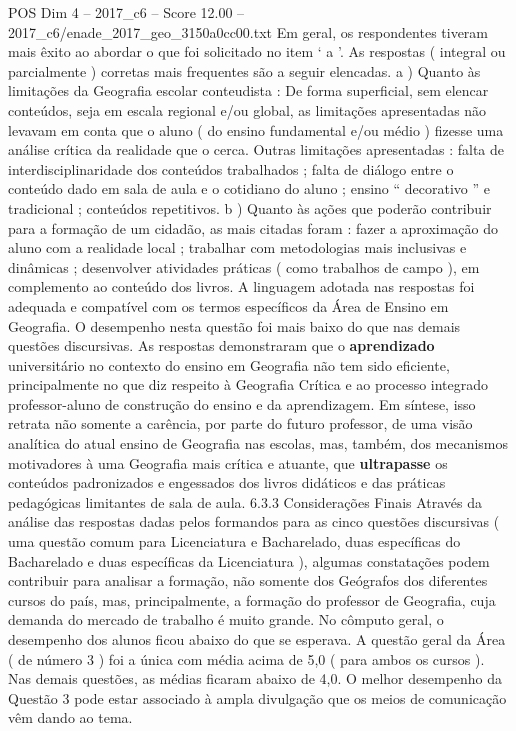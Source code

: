 \begin{textsample}{POS Dim 4 – 2017\_c6 – Score 12.00 – 2017\_c6/enade\_2017\_geo\_3150a0cc00.txt}
Em geral, os respondentes tiveram mais êxito ao abordar o que foi solicitado no item ‘ a ’.
As respostas ( integral ou parcialmente ) corretas mais frequentes são a seguir elencadas. a ) Quanto às limitações da Geografia escolar conteudista : De forma superficial, sem elencar conteúdos, seja em escala regional e/ou global, as limitações apresentadas não levavam em conta que o aluno ( do ensino fundamental e/ou médio ) fizesse uma análise crítica da realidade que o cerca.
Outras limitações apresentadas : falta de interdisciplinaridade dos conteúdos trabalhados ; falta de diálogo entre o conteúdo dado em sala de aula e o cotidiano do aluno ; ensino “ decorativo ” e tradicional ; conteúdos repetitivos. b ) Quanto às ações que poderão contribuir para a formação de um cidadão, as mais citadas foram : fazer a aproximação do aluno com a realidade local ; trabalhar com metodologias mais inclusivas e dinâmicas ; desenvolver atividades práticas ( como trabalhos de campo ), em complemento ao conteúdo dos livros.
A linguagem adotada nas respostas foi adequada e compatível com os termos específicos da Área de Ensino em Geografia.
O desempenho nesta questão foi mais baixo do que nas demais questões discursivas.
As respostas demonstraram que o \textbf{aprendizado} universitário no contexto do ensino em Geografia não tem sido eficiente, principalmente no que diz respeito à Geografia Crítica e ao processo integrado professor-aluno de construção do ensino e da aprendizagem.
Em síntese, isso retrata não somente a carência, por parte do futuro professor, de uma visão analítica do atual ensino de Geografia nas escolas, mas, também, dos mecanismos motivadores à uma Geografia mais crítica e atuante, que \textbf{ultrapasse} os conteúdos padronizados e engessados dos livros didáticos e das práticas pedagógicas limitantes de sala de aula. 6.3.3 Considerações Finais Através da análise das respostas dadas pelos formandos para as cinco questões discursivas ( uma questão comum para Licenciatura e Bacharelado, duas específicas do Bacharelado e duas específicas da Licenciatura ), algumas constatações podem contribuir para analisar a formação, não somente dos Geógrafos dos diferentes cursos do país, mas, principalmente, a formação do professor de Geografia, cuja demanda do mercado de trabalho é muito grande.
No cômputo geral, o desempenho dos alunos ficou abaixo do que se esperava.
A questão geral da Área ( de número 3 ) foi a única com média acima de 5,0 ( para ambos os cursos ).
Nas demais questões, as médias ficaram abaixo de 4,0.
O melhor desempenho da Questão 3 pode estar associado à ampla divulgação que os meios de comunicação vêm dando ao tema.

\end{textsample}
